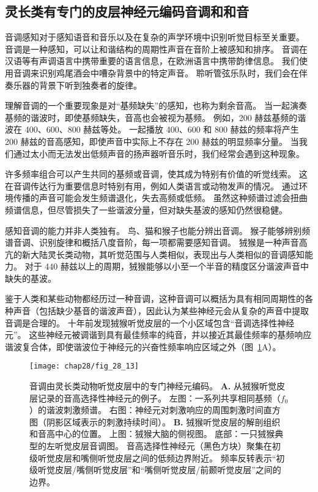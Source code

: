 \subsection{灵长类有专门的皮层神经元编码音调和和音}

音调感知对于感知语音和音乐以及在复杂的声学环境中识别听觉目标至关重要。
音调是一种感知，可以让和谐结构的周期性声音在音阶上被感知和排序。
音调在汉语等有声调语言中携带重要的语言信息，在欧洲语言中携带韵律信息。
我们使用音调来识别鸡尾酒会中嘈杂背景中的特定声音。
聆听管弦乐队时，我们会在伴奏乐器的背景下听到独奏者的旋律。


理解音调的一个重要现象是对“基频缺失”的感知，也称为剩余音高。
当一起演奏基频的谐波时，即使基频缺失，音高也会被视为基频。
例如，200 赫兹基频的谐波在 400、600、800 赫兹等处。
一起播放 400、600 和 800 赫兹的频率将产生 200 赫兹的音高感知，即使声音中实际上不存在 200 赫兹的明显频率分量。
当我们通过太小而无法发出低频声音的扬声器听音乐时，我们经常会遇到这种现象。


许多频率组合可以产生共同的基频或音调，使其成为特别有价值的听觉线索。
这在音调传达行为重要信息时特别有用，例如人类语言或动物发声的情况。
通过环境传播的声音可能会发生频谱退化，失去高频或低频。
虽然这种频谱过滤会扭曲频谱信息，但尽管损失了一些谐波分量，但对缺失基波的感知仍然很稳健。


感知音调的能力并非人类独有。
鸟、猫和猴子也能分辨出音调。
猴子能够辨别频谱音调、识别旋律和概括八度音阶，每一项都需要感知音调。
狨猴是一种声音高亢的新大陆灵长类动物，其听觉范围与人类相似，表现出与人类相似的音调感知能力。
对于 440 赫兹以上的周期，狨猴能够以小至一个半音的精度区分谐波声音中缺失的基波。


鉴于人类和某些动物都经历过一种音调，这种音调可以概括为具有相同周期性的各种声音（包括缺少基音的谐波声音），因此认为某些神经元会从复杂的声音中提取音调是合理的。
十年前发现狨猴听觉皮层的一个小区域包含“音调选择性神经元”\cite{bendor2005neuronal}。
这些神经元被调谐到具有最佳频率的纯音，并以接近其最佳频率的基频响应谐波复合体，即使谐波位于神经元的兴奋性频率响应区域之外（图~\ref{fig:28_13}A）。


\begin{figure}[htbp]
	\centering
	\texttt{[image: chap28/fig\_28\_13]}
	\caption{音调由灵长类动物听觉皮层中的专门神经元编码。
		\textbf{A.} 从狨猴听觉皮层记录的音高选择性神经元的例子。
		左图：一系列共享相同基频（$f_0$）的谐波刺激频谱。
		右图：神经元对刺激响应的周围刺激时间直方图（阴影区域表示的刺激持续时间）\cite{bendor2005neuronal}。
		\textbf{B.} 狨猴听觉皮层的解剖组织和音高中心的位置。
		上图：狨猴大脑的侧视图。
		底部：一只狨猴典型的左听觉皮层音调图。
		音高选择性神经元（黑色方块）聚集在初级听觉皮层和嘴侧听觉皮层之间的低频边界附近。
		频率反转表示“初级听觉皮层/嘴侧听觉皮层”和“嘴侧听觉皮层/前颞听觉皮层”之间的边界\cite{bendor2005neuronal}。}
	\label{fig:28_13}
\end{figure}


